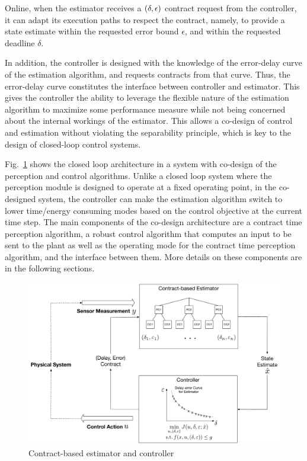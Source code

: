 Online, when the estimator receives a $(\delta,\epsilon)$ contract request from the controller, it can adapt its execution paths to respect the contract, namely, to provide a state estimate within the requested error bound $\epsilon$, and within the requested deadline $\delta$.

In addition, the controller is designed with the knowledge of the error-delay curve of the estimation algorithm, and requests contracts from that curve.
Thus, the error-delay curve constitutes the interface between controller and estimator.
This gives the controller the ability to leverage the flexible nature of the estimation algorithm to maximize some performance measure while not being concerned about the internal workings of the estimator.
This allows a co-design of control and estimation without violating the separability principle, which is key to the design of closed-loop control systems.

Fig.~\ref{fig:fullcodesignedCE} shows the closed loop architecture in a system with co-design of the perception and control algorithms.
Unlike a closed loop system where the perception module is designed to operate at a fixed operating point, in the co-designed system, the controller can make the estimation algorithm switch to lower time/energy consuming modes based on the control objective at the current time step.
The main components of the co-design architecture are a contract time perception algorithm, a robust control algorithm that computes an input to be sent to the plant as well as the operating mode for the contract time perception algorithm, and the interface between them. More details on these components are in the following sections.

\begin{figure}[t]
	\centering
	\includegraphics[width=0.9\columnwidth]{figures/omnigraffle_figures/mid_level_figure2}
	\caption{Contract-based estimator and controller}
	\label{fig:fullcodesignedCE}
\end{figure}
